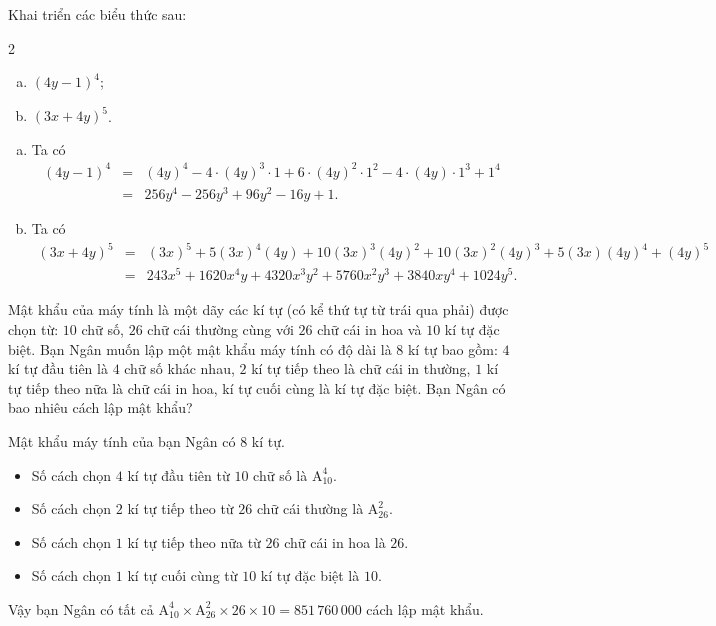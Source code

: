 \begin{bt}%
	Khai triển các biểu thức sau:
	\begin{multicols}{2}
		\begin{enumerate}[a)]
			\item $(4y-1)^4$;
			\item $(3x+4y)^5$.
		\end{enumerate}
	\end{multicols}
	\loigiai
	{\begin{enumerate}[a)]
			\item Ta có \begin{eqnarray*}
				(4y-1)^4&=& (4y)^4-4\cdot (4y)^3\cdot 1+6\cdot (4y)^2\cdot 1^2-4\cdot (4y)\cdot 1^3+1^4\\
				&=& 256y^4-256y^3+96y^2-16y+1.
			\end{eqnarray*}
			\item Ta có
			\begin{eqnarray*}
				(3x+4y)^5&=&(3x)^5+5(3x)^4(4y)+10(3x)^3(4y)^2+10(3x)^2(4y)^3+5(3x)(4y)^4+(4y)^5\\
				&=&243x^5+1620x^4y+4320x^3y^2+5760x^2y^3+3840xy^4+1024y^5.
			\end{eqnarray*}
		\end{enumerate}
	}
\end{bt}

\begin{bt}%
	Mật khẩu của máy tính là một dãy các kí tự (có kể thứ tự từ trái qua phải) được chọn từ: $10$ chữ số, $26$ chữ cái thường cùng với $26$ chữ cái in hoa và $10$ kí tự đặc biệt. Bạn Ngân muốn lập một mật khẩu máy tính có độ dài là $8$ kí tự bao gồm: $4$ kí tự đầu tiên là $4$ chữ số khác nhau, $2$ kí tự tiếp theo là chữ cái in thường, $1$ kí tự tiếp theo nữa là chữ cái in hoa, kí tự cuối cùng là kí tự đặc biệt. Bạn Ngân có bao nhiêu cách lập mật khẩu?
	\loigiai
	{Mật khẩu máy tính của bạn Ngân có $8$ kí tự.
		\begin{itemize}
			\item Số cách chọn $4$ kí tự đầu tiên từ $10$ chữ số là $\mathrm{A}_{10}^4$.
			\item Số cách chọn $2$ kí tự tiếp theo từ $26$ chữ cái thường là $\mathrm{A}_{26}^2$.
			\item Số cách chọn $1$ kí tự tiếp theo nữa từ $26$ chữ cái in hoa là $26$.
			\item Số cách chọn $1$ kí tự cuối cùng từ $10$ kí tự đặc biệt là $10$.
		\end{itemize}
		Vậy bạn Ngân có tất cả $\mathrm{A}_{10}^4\times \mathrm{A}_{26}^2\times 26\times 10=851\, 760\, 000$ cách lập mật khẩu.
	}
\end{bt}

